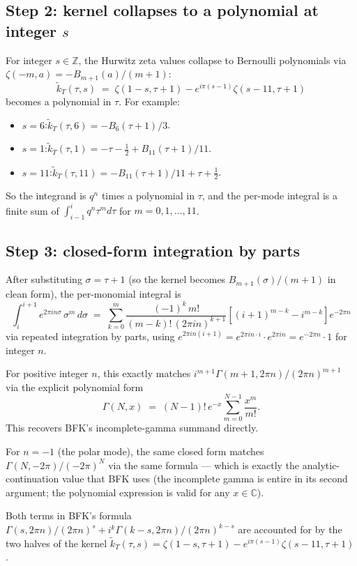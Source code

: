 \documentclass[11pt]{article}
\newcommand{\CC}{\mathbb{C}}
\newcommand{\ZZ}{\mathbb{Z}}
\begin{document}
\subsection*{Step 2: kernel collapses to a polynomial at integer $s$}

For integer $s \in \ZZ$, the Hurwitz zeta values collapse to Bernoulli polynomials via $\zeta(-m, a) = -B_{m+1}(a)/(m+1)$:
\[
\widetilde{k}_T(\tau, s) \;=\; \zeta(1-s, \tau+1) - e^{i\pi(s-1)}\zeta(s-11, \tau+1)
\]
becomes a polynomial in $\tau$. For example:
\begin{itemize}
\item $s = 6$:\quad $\widetilde{k}_T(\tau, 6) = -B_6(\tau+1)/3$.
\item $s = 1$:\quad $\widetilde{k}_T(\tau, 1) = -\tau - \tfrac{1}{2} + B_{11}(\tau+1)/11$.
\item $s = 11$:\quad $\widetilde{k}_T(\tau, 11) = -B_{11}(\tau+1)/11 + \tau + \tfrac{1}{2}$.
\end{itemize}
So the integrand is $q^n$ times a polynomial in $\tau$, and the per-mode integral is a finite sum of $\int_{i-1}^{i} q^n \tau^m d\tau$ for $m = 0, 1, \dots, 11$.

\subsection*{Step 3: closed-form integration by parts}

After substituting $\sigma = \tau + 1$ (so the kernel becomes $B_{m+1}(\sigma)/(m+1)$ in clean form), the per-monomial integral is
\[
\int_i^{i+1} e^{2\pi i n \sigma}\, \sigma^m\, d\sigma \;=\; \sum_{k=0}^{m} \frac{(-1)^k\, m!}{(m-k)!\,(2\pi i n)^{k+1}} \left[(i+1)^{m-k} - i^{m-k}\right] e^{-2\pi n}
\]
via repeated integration by parts, using $e^{2\pi i n (i+1)} = e^{2\pi i n \cdot i}\cdot e^{2\pi i n} = e^{-2\pi n}\cdot 1$ for integer $n$.

For positive integer $n$, this exactly matches $i^{m+1}\Gamma(m+1, 2\pi n)/(2\pi n)^{m+1}$ via the explicit polynomial form
\[
\Gamma(N, x) \;=\; (N-1)!\, e^{-x} \sum_{m=0}^{N-1} \frac{x^m}{m!}.
\]
This recovers BFK's incomplete-gamma summand directly.

For $n = -1$ (the polar mode), the same closed form matches $\Gamma(N, -2\pi)/(-2\pi)^N$ via the same formula --- which is exactly the analytic-continuation value that BFK uses (the incomplete gamma is entire in its second argument; the polynomial expression is valid for any $x \in \CC$).

Both terms in BFK's formula $\Gamma(s, 2\pi n)/(2\pi n)^s + i^k \Gamma(k-s, 2\pi n)/(2\pi n)^{k-s}$ are accounted for by the two halves of the kernel $\widetilde{k}_T(\tau, s) = \zeta(1-s, \tau+1) - e^{i\pi(s-1)}\zeta(s-11, \tau+1)$.
\end{document}
